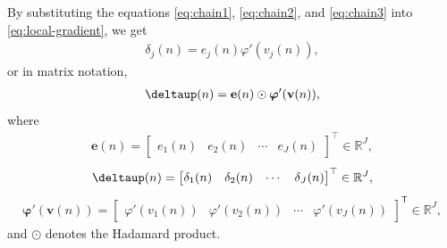 \documentclass[12pt,a4paper]{article}
\newcommand{\trans}{\mathsf{T}}
\newcommand{\Real}{\mathbb{R}}
\begin{document}
By substituting the equations \eqref{eq:chain1}, \eqref{eq:chain2}, and \eqref{eq:chain3} into \eqref{eq:local-gradient}, we get
\begin{align}
    \delta_j (n) = e_{j}(n) \varphi'(v_{j}(n)),
\end{align}
or in matrix notation,
\begin{align}
    \boldsymbol{\deltaup}(n) = \mathbf{e}(n) \odot \boldsymbol{\varphi}'(\mathbf{v}(n)),
\end{align}
where
\begin{align}
    \mathbf{e}(n) = \begin{bmatrix}
        e_1 (n) & e_2 (n) & \cdots & e_J (n)
    \end{bmatrix}^\top \in \mathbb{R}^{J},
\end{align}
\begin{align}
    \boldsymbol{\deltaup}(n) = \begin{bmatrix}
        \delta_1 (n) & \delta_2 (n) & \cdots & \delta_J (n)
    \end{bmatrix}^\top \in \mathbb{R}^{J},
\end{align}
\begin{align}
    \boldsymbol{\varphi}'(\mathbf{v}(n)) = \begin{bmatrix}
        \varphi'(v_1(n)) & \varphi'(v_2(n)) & \cdots & \varphi'(v_J(n))
    \end{bmatrix}^\trans \in \Real^{J},
\end{align}
and \(\odot\) denotes the Hadamard product.
\end{document}

